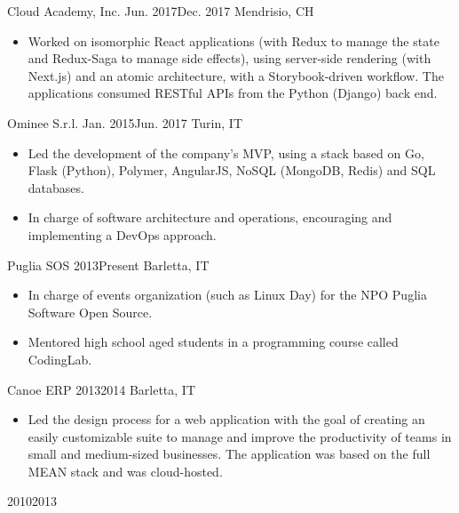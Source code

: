\documentclass{resume}
\begin{document}
\begin{cvsection}
        {Cloud Academy, Inc.}%
        {Jun. 2017}{Dec. 2017}%
        {Mendrisio, CH}%
        {%
            \begin{itemize}
                \item Worked on isomorphic React applications (with Redux to
                    manage the state and Redux-Saga to manage side effects),
                    using server-side rendering (with Next.js) and an atomic
                    architecture, with a Storybook-driven workflow. The
                    applications consumed RESTful APIs from the Python (Django)
                    back end.
            \end{itemize}
        }

        {Ominee S.r.l.}%
        {Jan. 2015}{Jun. 2017}%
        {Turin, IT}%
        {%
            \begin{itemize}
                \item Led the development of the company's MVP, using a stack
                    based on Go, Flask (Python), Polymer, AngularJS, NoSQL
                    (MongoDB, Redis) and SQL databases.
                \item In charge of software architecture and operations,
                    encouraging and implementing a DevOps approach.
            \end{itemize}
        }

        {Puglia SOS}%
        {2013}{Present}%
        {Barletta, IT}%
        {%
            \begin{itemize}
                \item In charge of events organization (such as Linux Day) for
                    the NPO Puglia Software Open Source.
                \item Mentored high school aged students in a programming course
                    called CodingLab.
            \end{itemize}
        }

        {Canoe ERP}%
        {2013}{2014}%
        {Barletta, IT}%
        {%
            \begin{itemize}
                \item Led the design process for a web application with the goal
                    of creating an easily customizable suite to manage and
                    improve the productivity of teams in small and medium-sized
                    businesses. The application was based on the full MEAN
                    stack and was cloud-hosted.
            \end{itemize}
        }

        {}%
        {2010}{2013}%
        {}{}
\end{cvsection}
\end{document}
